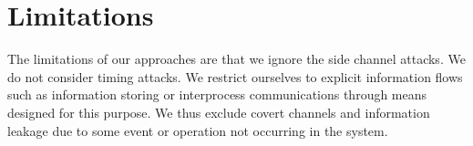\section{Limitations}
The limitations of our approaches are that we ignore the side channel attacks. We do not consider timing attacks. We restrict ourselves
to explicit information flows such as information storing or interprocess communications through means designed for this purpose.
We thus exclude covert channels and information leakage due to
some event or operation not occurring in the system.